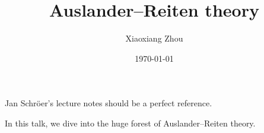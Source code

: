 \documentclass[pdf]{beamer}
\title{Auslander--Reiten theory}
\author{Xiaoxiang Zhou}
\institute[Bonn uni]{Universität Bonn}
\date{\today} %
\numberwithin{equation}{section}
\theoremstyle{plain}
\theoremstyle{plain}
\theoremstyle{remark}
\begin{document}
\begin{frame}
	\titlepage
	Jan Schröer's lecture notes should be a perfect reference. 
\end{frame}
\begin{frame}
In this talk, we dive into the huge forest of Auslander--Reiten theory.
\end{frame}
\end{document}
